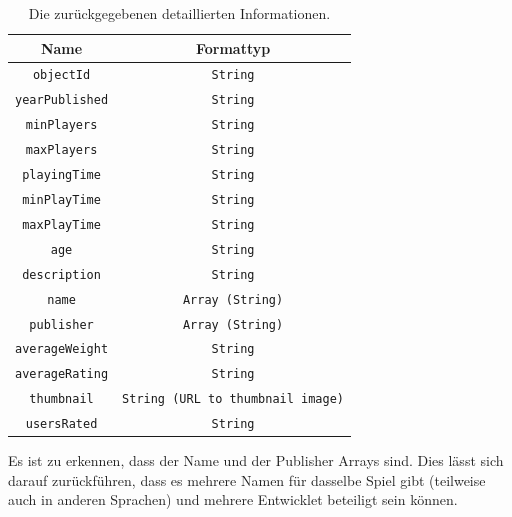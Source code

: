 \begin{table}[H]
    \centering
    \begin{tabular}{|c|c|}
        \hline
        \textbf{Name} & \textbf{Formattyp} \\
        \hline
        \texttt{objectId} & \texttt{String} \\
        \texttt{yearPublished} & \texttt{String} \\
        \texttt{minPlayers} & \texttt{String} \\
        \texttt{maxPlayers} & \texttt{String} \\
        \texttt{playingTime} & \texttt{String} \\
        \texttt{minPlayTime} & \texttt{String} \\
        \texttt{maxPlayTime} & \texttt{String} \\
        \texttt{age} & \texttt{String} \\
        \texttt{description} & \texttt{String} \\
        \texttt{name} & \texttt{Array (String)} \\
        \texttt{publisher} & \texttt{Array (String)} \\
        \texttt{averageWeight} & \texttt{String} \\
        \texttt{averageRating} & \texttt{String} \\
        \texttt{thumbnail} & \texttt{String (URL to thumbnail image)} \\
        \texttt{usersRated} & \texttt{String} \\
        \hline
    \end{tabular}
    \caption{Die zurückgegebenen detaillierten Informationen.}
    \label{tab:boardgame_properties}
\end{table}
Es ist zu erkennen, dass der Name und der Publisher Arrays sind. Dies lässt sich darauf zurückführen, dass es mehrere Namen für dasselbe Spiel gibt (teilweise auch in anderen Sprachen) und mehrere Entwicklet beteiligt sein können.
